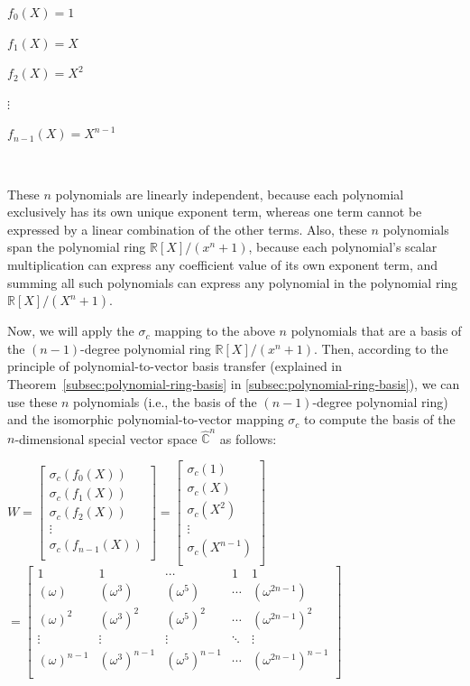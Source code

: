 $f_0(X) = 1$

$f_1(X) = X$

$f_2(X) = X^2$

$\vdots$

$f_{n-1}(X) = X^{n-1}$

$ $

These $n$ polynomials are linearly independent, because each polynomial exclusively has its own unique exponent term, whereas one term cannot be expressed by a linear combination of the other terms. Also, these $n$ polynomials span the polynomial ring $\mathbb{R}[X]/(x^n + 1)$, because each polynomial's scalar multiplication can express any coefficient value of its own exponent term, and summing all such polynomials can express any polynomial in the polynomial ring $\mathbb{R}[X]/(X^n + 1)$.


Now, we will apply the $\sigma_c$ mapping to the above $n$ polynomials that are a basis of the $(n-1)$-degree polynomial ring $\mathbb{R}[X]/(x^n + 1)$. Then, according to the principle of polynomial-to-vector basis transfer (explained in Theorem~\ref*{subsec:polynomial-ring-basis} in \autoref{subsec:polynomial-ring-basis}), we can use these $n$ polynomials (i.e., the basis of the $(n-1)$-degree polynomial ring) and the isomorphic polynomial-to-vector mapping $\sigma_c$ to compute the basis of the $n$-dimensional special vector space $\hat{\mathbb C}^{n}$ as follows: 

$W = \begin{bmatrix}
\sigma_c(f_0(X)) \\
\sigma_c(f_1(X)) \\
\sigma_c(f_2(X)) \\
\vdots \\
\sigma_c(f_{n-1}(X)) \\
\end{bmatrix}
= \begin{bmatrix}
\sigma_c(1) \\
\sigma_c(X) \\
\sigma_c(X^2) \\
\vdots \\
\sigma_c(X^{n-1}) \\
\end{bmatrix}$
$= \begin{bmatrix}
1 & 1 & \cdots & 1 & 1\\
(\omega) & (\omega^3) & (\omega^5) & \cdots & (\omega^{2n-1})\\
(\omega)^2 & (\omega^3)^2 & (\omega^5)^2 & \cdots & (\omega^{2n-1})^2\\
\vdots & \vdots & \vdots & \ddots & \vdots \\
(\omega)^{n-1} & (\omega^3)^{n-1} & (\omega^5)^{n-1} & \cdots & (\omega^{2n-1})^{n-1}\\
\end{bmatrix}$


